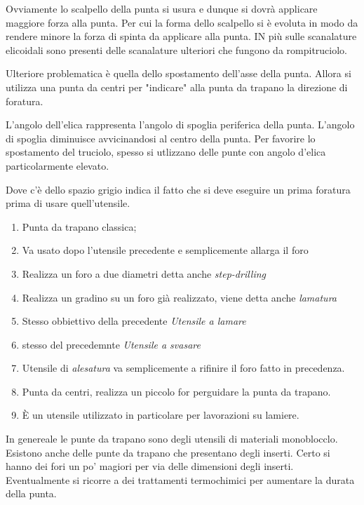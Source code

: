 Ovviamente lo scalpello della punta si usura e dunque si dovrà applicare maggiore forza alla punta.
Per cui la forma dello scalpello si è evoluta in modo da rendere minore la forza di spinta da applicare alla 
punta. IN più sulle scanalature elicoidali sono presenti delle scanalature ulteriori che fungono da 
rompitruciolo.

Ulteriore problematica è quella dello spostamento dell'asse della punta. Allora si utilizza una punta
da centri per "indicare" alla punta da trapano la direzione di foratura.

L'angolo dell'elica rappresenta l'angolo di spoglia periferica della punta.
L'angolo di spoglia diminuisce avvicinandosi al centro della punta.
Per favorire lo spostamento del truciolo, spesso si utlizzano delle punte con angolo d'elica particolarmente 
elevato.


Dove c'è dello spazio grigio indica il fatto che si deve eseguire un prima foratura prima di usare 
quell'utensile.

\begin{enumerate}
\item Punta da trapano classica;
\item Va usato dopo l'utensile precedente e semplicemente allarga il foro
\item Realizza un foro a due diametri detta anche \emph{step-drilling}
\item Realizza un gradino su un foro già realizzato, viene detta anche \emph{lamatura}
\item Stesso obbiettivo della precedente \emph{Utensile a lamare}
\item stesso del precedemnte \emph{Utensile a svasare}
\item Utensile di \emph{alesatura} va semplicemente a rifinire il foro fatto in precedenza.
\item Punta da centri, realizza un piccolo for perguidare la punta da trapano.
\item È un utensile utilizzato in particolare per lavorazioni su lamiere.
\end{enumerate}

In genereale le punte da trapano sono degli utensili di materiali monoblocclo. Esistono anche delle punte
da trapano che presentano degli inserti. Certo si hanno dei fori un po' magiori per via delle dimensioni
degli inserti.
Eventualmente si ricorre a dei trattamenti termochimici per aumentare la durata della punta.

